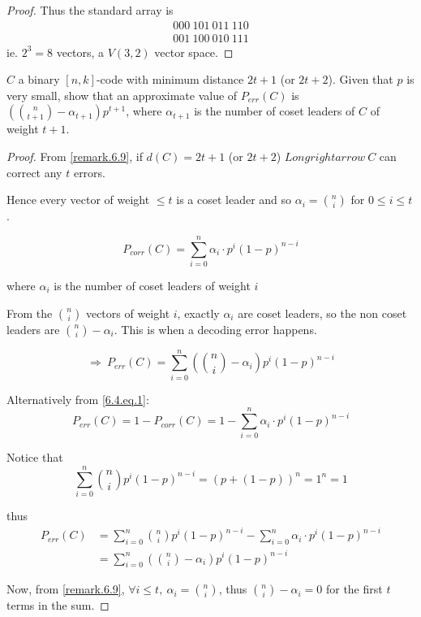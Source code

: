 \documentclass{article}
\theoremstyle{definition}
\newenvironment{ex}[1]
{\renewcommand\theinnerex{#1}\innerex}
{\endinnerex}
\begin{document}
\begin{proof}
  Thus the standard array is
  \begin{align*}
    000~101~011~110\\
    001~100~010~111
  \end{align*}
  ie. $2^3=8$ vectors, a $V(3,2)$ vector space.
\end{proof}

\begin{ex}{6.4}
  $C$ a binary $[n,k]$-code with minimum distance $2t+1$ (or $2t+2$). Given that $p$ is very small, show that an approximate value of $P_{err}(C)$ is $\left( \binom{n}{t+1} - \alpha_{t+1} \right) p^{t+1}$, where $\alpha_{t+1}$ is the number of coset leaders of $C$ of weight $t+1$.
\end{ex}
\begin{proof}
  From \ref{remark.6.9}, if $d(C)=2t+1$ (or $2t+2$) $Longrightarrow~ C$ can correct any $t$ errors.

  Hence every vector of weight $\leq t$ is a coset leader and so $\alpha_i = \binom{n}{i}$ for $0 \leq i \leq t$.

  \begin{equation}
    P_{corr}(C) = \sum_{i=0}^n \alpha_i \cdot p^i(1-p)^{n-i}
    \label{6.4.eq.1}
  \end{equation}

  where $\alpha_i$ is the number of coset leaders of weight $i$

  From the $\binom{n}{i}$ vectors of weight $i$, exactly $\alpha_i$ are coset leaders, so the non coset leaders are $\binom{n}{i} - \alpha_i$. This is when a decoding error happens.

  $$\Longrightarrow~ P_{err}(C) = \sum_{i=0}^n \left( \binom{n}{i} - \alpha_i \right) p^i (1-p)^{n-i}$$


  \vspace{0.5cm}
  Alternatively from \ref{6.4.eq.1}:
  $$P_{err}(C) = 1 - P_{corr}(C) = 1 - \sum_{i=0}^n \alpha_i \cdot p^i(1-p)^{n-i}$$

  Notice that
  $$\sum_{i=0}^n \binom{n}{i} p^i (1-p)^{n-i} = (p + (1-p))^n = 1^n = 1$$

  thus
  \begin{align*}
    P_{err}(C) &= \sum_{i=0}^n \binom{n}{i} p^i (1-p)^{n-i} - \sum_{i=0}^n \alpha_i \cdot p^i(1-p)^{n-i}\\
               &= \sum_{i=0}^n \left( \binom{n}{i} - \alpha_i \right) p^i (1-p)^{n-i}
  \end{align*}

  Now, from \ref{remark.6.9}, $\forall i \leq t,~ \alpha_i = \binom{n}{i}$, thus $\binom{n}{i} - \alpha_i = 0$ for the first $t$ terms in the sum.


\end{proof}
\end{document}
